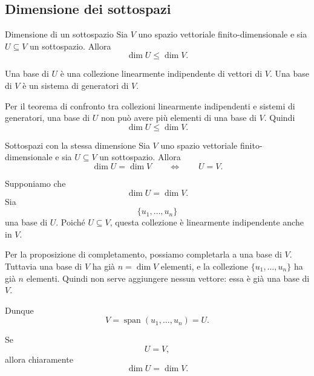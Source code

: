 \documentclass[a4paper]{article}
\begin{document}
\subsection{Dimensione dei sottospazi}

\begin{snippetproposition}{Dimensione di un sottospazio}
    Sia \(V\) uno spazio vettoriale finito-dimensionale e sia \(U\subseteq V\) un sottospazio. Allora
    \[
        \dim U\leq \dim V.
    \]
\end{snippetproposition}

\begin{snippetproof}{}
    Una base di \(U\) è una collezione linearmente indipendente di vettori di \(V\). Una base di \(V\) è un sistema di generatori di \(V\).

    Per il teorema di confronto tra collezioni linearmente indipendenti e sistemi di generatori, una base di \(U\) non può avere più elementi di una base di \(V\). Quindi
    \[
        \dim U\leq \dim V.
    \]
\end{snippetproof}

\begin{snippetproposition}{Sottospazi con la stessa dimensione}
    Sia \(V\) uno spazio vettoriale finito-dimensionale e sia \(U\subseteq V\) un sottospazio. Allora
    \[
        \dim U=\dim V
        \qquad
        \Longleftrightarrow
        \qquad
        U=V.
    \]
\end{snippetproposition}

\begin{snippetproof}{}
    \begin{iffproof}
    \item Supponiamo che
        \[
            \dim U=\dim V.
        \]
        Sia
        \[
            \{u_1,\ldots,u_n\}
        \]
        una base di \(U\). Poiché \(U\subseteq V\), questa collezione è linearmente indipendente anche in \(V\).

        Per la proposizione di completamento, possiamo completarla a una base di \(V\). Tuttavia una base di \(V\) ha già \(n=\dim V\) elementi, e la collezione \(\{u_1,\ldots,u_n\}\) ha già \(n\) elementi. Quindi non serve aggiungere nessun vettore: essa è già una base di \(V\).

        Dunque
        \[
            V=\operatorname{span}(u_1,\ldots,u_n)=U.
        \]

    \item Se
        \[
            U=V,
        \]
        allora chiaramente
        \[
            \dim U=\dim V.
        \]
    \end{iffproof}
\end{snippetproof}
\end{document}
